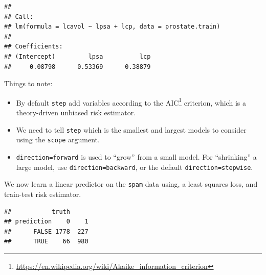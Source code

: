 \documentclass[]{book}
\newenvironment{Shaded}{\begin{snugshade}}{\end{snugshade}}
\newcommand{\CommentTok}[1]{\textcolor[rgb]{0.56,0.35,0.01}{\textit{#1}}}
\newcommand{\DataTypeTok}[1]{\textcolor[rgb]{0.13,0.29,0.53}{#1}}
\newcommand{\FloatTok}[1]{\textcolor[rgb]{0.00,0.00,0.81}{#1}}
\newcommand{\KeywordTok}[1]{\textcolor[rgb]{0.13,0.29,0.53}{\textbf{#1}}}
\newcommand{\NormalTok}[1]{#1}
\newcommand{\OperatorTok}[1]{\textcolor[rgb]{0.81,0.36,0.00}{\textbf{#1}}}
\newcommand{\StringTok}[1]{\textcolor[rgb]{0.31,0.60,0.02}{#1}}
\providecommand{\tightlist}{%
  \setlength{\itemsep}{0pt}\setlength{\parskip}{0pt}}
\renewcommand{\href}[2]{#2\footnote{\url{#1}}}
\theoremstyle{definition}
\theoremstyle{definition}
\theoremstyle{definition}
\theoremstyle{remark}
\begin{document}
\begin{verbatim}
## 
## Call:
## lm(formula = lcavol ~ lpsa + lcp, data = prostate.train)
## 
## Coefficients:
## (Intercept)         lpsa          lcp  
##     0.08798      0.53369      0.38879
\end{verbatim}

Things to note:

\begin{itemize}
\tightlist
\item
  By default \texttt{step} add variables according to the \href{https://en.wikipedia.org/wiki/Akaike_information_criterion}{AIC} criterion, which is a theory-driven unbiased risk estimator.
\item
  We need to tell \texttt{step} which is the smallest and largest models to consider using the \texttt{scope} argument.
\item
  \texttt{direction=\textquotesingle{}forward\textquotesingle{}} is used to ``grow'' from a small model. For ``shrinking'' a large model, use \texttt{direction=\textquotesingle{}backward\textquotesingle{}}, or the default \texttt{direction=\textquotesingle{}stepwise\textquotesingle{}}.
\end{itemize}

We now learn a linear predictor on the \texttt{spam} data using, a least squares loss, and train-test risk estimator.

\begin{Shaded}
\end{Shaded}

\begin{verbatim}
##           truth
## prediction    0    1
##      FALSE 1778  227
##      TRUE    66  980
\end{verbatim}
\end{document}
